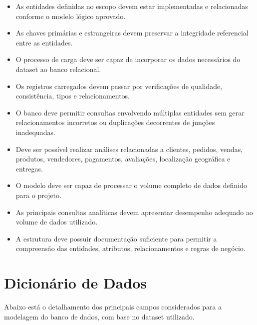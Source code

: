 \documentclass[12pt,a4paper]{article}
\begin{document}
\begin{itemize}
    \item As entidades definidas no escopo devem estar implementadas e relacionadas conforme o modelo lógico aprovado.

    \item As chaves primárias e estrangeiras devem preservar a integridade referencial entre as entidades.

    \item O processo de carga deve ser capaz de incorporar os dados necessários do dataset ao banco relacional.

    \item Os registros carregados devem passar por verificações de qualidade, consistência, tipos e relacionamentos.

    \item O banco deve permitir consultas envolvendo múltiplas entidades sem gerar relacionamentos incorretos ou duplicações decorrentes de junções inadequadas.

    \item Deve ser possível realizar análises relacionadas a clientes, pedidos, vendas, produtos, vendedores, pagamentos, avaliações, localização geográfica e entregas.

    \item O modelo deve ser capaz de processar o volume completo de dados definido para o projeto.

    \item As principais consultas analíticas devem apresentar desempenho adequado ao volume de dados utilizado.

    \item A estrutura deve possuir documentação suficiente para permitir a compreensão das entidades, atributos, relacionamentos e regras de negócio.
\end{itemize}

\section{Dicionário de Dados}

Abaixo está o detalhamento dos principais campos considerados para a modelagem do banco de dados, com base no dataset utilizado.

\vspace{0.5cm}
\end{document}
